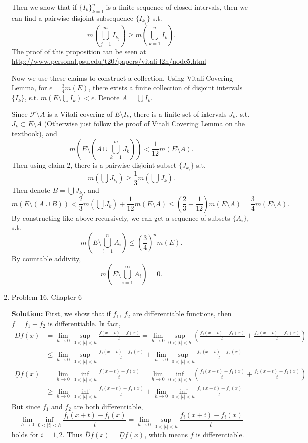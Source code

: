\documentclass{article}%
\begin{document}
\begin{enumerate}
Then we show that if $\{I_k\}_{k=1}^{n} $ is a finite sequence of closed intervals, then we can find a pairwise disjoint subsequence $\{I_{k_j}\}$ s.t. 
$$
m(\bigcup_{j = 1}^{m} I_{k_j}) \ge m(\bigcup_{k=1}^{n}I_k).
$$
The proof of this proposition can be seen at \href{http://www.personal.psu.edu/t20/papers/vitali-l2h/node5.html}{http://www.personal.psu.edu/t20/papers/vitali-l2h/node5.html}

Now we use these claims to construct a collection. Using Vitali Covering Lemma, for $\epsilon = \frac{3}{4}m(E)$, there exists a finite collection of disjoint intervals $\{I_k\}$, s.t. $m(E\setminus \bigcup I_k) < \epsilon$. Denote $A = \bigcup I_k $.

Since $\mathcal{F}\setminus A$ is a Vitali covering of $E\setminus I_k $, there is a finite set of intervals $J_k $, s.t. $J_k\subset E\setminus A $ (Otherwise just follow the proof of Vitali Covering Lemma on the textbook), and 
$$
m(E\setminus (A\cup\bigcup_{k=1}^m J_k)) < \frac{1}{12}m(E\setminus A).
$$
Then using claim 2, there is a pairwise disjoint subset $\{J_{k_i}\}$ s.t. 
$$
m(\bigcup J_{k_i}) \ge \frac{1}{3}m(\bigcup J_k).
$$
Then denote $B = \bigcup J_{k_i} $, and 
$$
m(E\setminus (A\cup B)) < \frac{2}{3}m(\bigcup J_k) +\frac{1}{12}m(E\setminus A) \le (\frac{2}{3}+\frac{1}{12})m(E\setminus A) = \frac{3}{4}m(E\setminus A).
$$
By constructing like above recursively, we can get a sequence of subsets $\{A_i\}$, s.t. 
$$
m(E\setminus \bigcup_{i=1}^n A_i) \le (\frac{3}{4})^n m(E).
$$
By countable addivity,
$$
m(E\setminus \bigcup_{i=1}^\infty A_i) = 0.
$$

\bigskip
\item  Problem 16, Chapter 6

\smallskip
\textbf{Solution:}
\smallskip
First, we show that if $f_1, ~f_2$ are differentiable functions, then $f = f_1+f_2$ is differentiable. In fact,
$$
\begin{aligned}
\overline{D}f(x) &= \lim_{h\to 0}\sup_{0 < |t| < h}\frac{f(x+t)-f(x)}{t} = \lim_{h\to 0}\sup_{0 < |t| < h}(\frac{f_1(x+t)-f_1(x)}{t}+\frac{f_2(x+t)-f_2(x)}{t}) \\
&\le \lim_{h\to 0}\sup_{0 < |t| < h}\frac{f_1(x+t)-f_1(x)}{t} + \lim_{h\to 0}\sup_{0 < |t| < h}\frac{f_2(x+t)-f_2(x)}{t}
\end{aligned}
$$
$$
\begin{aligned}
\underline{D}f(x) &= \lim_{h\to 0}\inf_{0 < |t| < h}\frac{f(x+t)-f(x)}{t} = \lim_{h\to 0}\inf_{0 < |t| < h}(\frac{f_1(x+t)-f_1(x)}{t}+\frac{f_2(x+t)-f_2(x)}{t}) \\
&\ge \lim_{h\to 0}\inf_{0 < |t| < h}\frac{f_1(x+t)-f_1(x)}{t} + \lim_{h\to 0}\inf_{0 < |t| < h}\frac{f_2(x+t)-f_2(x)}{t}
\end{aligned}
$$
But since $f_1$ and $f_2$ are both differentiable, 
$$
\lim_{h\to 0}\inf_{0 < |t| < h}\frac{f_i(x+t)-f_i(x)}{t} = \lim_{h\to 0}\sup_{0 < |t| < h}\frac{f_i(x+t)-f_i(x)}{t}
$$
holds for $i = 1, 2$. Thus $\overline{D}f(x) = \underline{D}f(x)$, which means $f$ is differentiable.


\end{enumerate}
\end{document}
